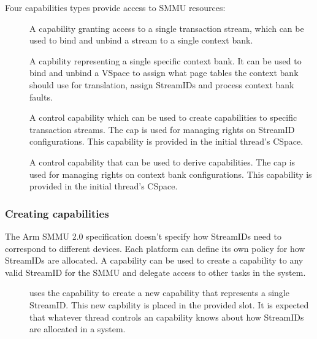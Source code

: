 Four capabilities types provide access to SMMU resources:
\begin{description}
    \item[] A capability granting access to a single
        transaction stream, which can be used to bind and unbind a stream to a
        single context bank.
    \item[] A capbility representing a single specific context
        bank. It can be used to bind and unbind a VSpace to assign what page
        tables the context bank should use for translation, assign StreamIDs and
        process context bank faults.
    \item[] A control capability which can be used to
        create  capabilities to specific transaction streams.
        The  cap is used for managing rights on
        StreamID configurations. This capability is provided in the initial
        thread's CSpace.
    \item[] A control capability that can be used to
        derive  capabilities. The 
        cap is used for managing rights on context bank configurations.
        This capability is provided in the initial thread's CSpace.
\end{description}


\subsubsection{Creating  capabilities}
\label{sec:smmuv2-creating-sel4-arm-sid-capabilities}

The Arm SMMU 2.0 specification doesn't specify how StreamIDs need to correspond
to different devices. Each platform can define its own policy for how StreamIDs
are allocated. A  capability can be used to create
a capability to any valid StreamID for the SMMU and delegate access to other
tasks in the system.

\begin{description}
\item[] uses the
     capability to create a new 
    capability that represents a single StreamID.  This new capbility is placed
    in the provided slot.  It is expected that whatever thread controls an
     capability knows about how StreamIDs are
    allocated in a system.
\end{description}

